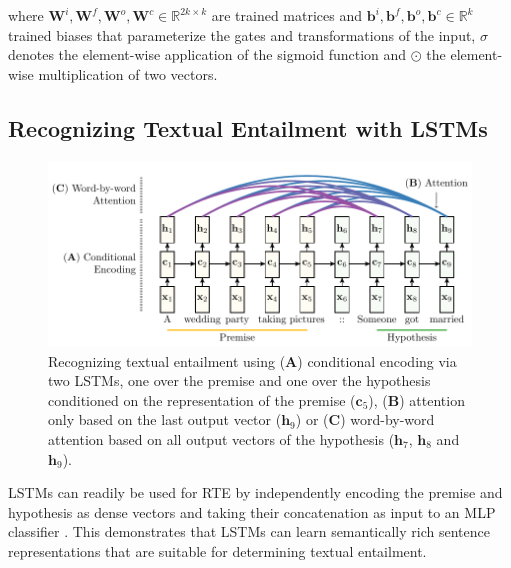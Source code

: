\documentclass{article}
\begin{document}
where $\mathbf{W}^i,\mathbf{W}^f,\mathbf{W}^o,\mathbf{W}^c\in\mathbb{R}^{2k\times k}$ are trained matrices and $\mathbf{b}^i, \mathbf{b}^f, \mathbf{b}^o, \mathbf{b}^c \in \mathbb{R}^k$ trained biases that parameterize the gates and transformations of the input, $\sigma$ denotes the element-wise application of the sigmoid function and $\odot$ the element-wise multiplication of two vectors.

\subsection{Recognizing Textual Entailment with LSTMs}

\begin{figure}[t]
\includegraphics[width=0.9\linewidth]{figs/overview}
\caption{Recognizing textual entailment using (\textbf{A}) conditional encoding via two LSTMs, one over the premise and one over the hypothesis conditioned on the representation of the premise ($\mathbf{c}_5$), (\textbf{B}) attention only based on the last output vector ($\mathbf{h}_9$) or (\textbf{C}) word-by-word attention based on all output vectors of the hypothesis ($\mathbf{h}_7$, $\mathbf{h}_8$ and $\mathbf{h}_9$).}
\label{fig:overview}
\end{figure}

\label{sec:lstm}
LSTMs can readily be used for RTE by independently encoding the premise and hypothesis as dense vectors and taking their concatenation as input to an MLP classifier \citep{bowman2015large}. This demonstrates that LSTMs can learn semantically rich sentence representations that are suitable for determining textual entailment.
\end{document}
